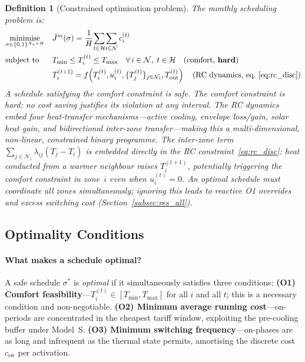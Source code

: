 \documentclass[3p,number]{elsarticle}
\let\oldsubsection\subsection
\renewcommand{\subsection}{\FloatBarrier\oldsubsection}
\newtheorem{definition}{Definition} \newtheorem{proposition}{Proposition} \newtheorem{remark}{Remark} \newtheorem{observation}{Observation}
\newcommand{\sched}{\sigma}
\newcommand{\Tmin}{T_{\min}}
\newcommand{\Tmax}{T_{\max}}
\newcommand{\Tout}{T_{\mathrm{out}}}
\newcommand{\lij}{\lambda_{ij}}
\newcommand{\csw}{c_{\mathrm{sw}}}
\newcommand{\Jbar}{\bar{J}}
\begin{document}
\begin{definition}[Constrained optimisation problem]
\label{def:cop}
The monthly scheduling problem is:
\begin{equation}
\begin{aligned}
  &\underset{\sched\in\{0,1\}^{N_z\times H}}{\text{minimise}}&&
  \Jbar^m(\sched)=\frac{1}{H}
  \!\sum_{t\in\mathcal{H}}\!\sum_{i\in\mathcal{N}} c_i^{(t)}\\
  &\text{subject to}&&
  \Tmin \le T_i^{(t)} \le \Tmax \quad\forall\,i\in\mathcal{N},\;
    t\in\mathcal{H} \quad\text{(comfort, \textbf{hard})}\\
  &&&T_i^{(t+1)}=f\!\left(T_i^{(t)},u_i^{(t)},
    \{T_j^{(t)}\}_{j\in\mathcal{N}_i},\Tout^{(t)}\right)
    \quad\text{(RC dynamics, eq.~\eqref{eq:rc_disc})}
\end{aligned}
\label{eq:cop}
\end{equation}
A schedule satisfying the comfort constraint is \emph{safe}.
The comfort constraint is \emph{hard}: no cost saving justifies its
violation at any interval.
The RC dynamics embed four heat-transfer mechanisms---active cooling,
envelope loss/gain, solar heat gain, and bidirectional inter-zone transfer---making this a
multi-dimensional, non-linear, constrained binary programme.
The inter-zone term $\sum_{j\in\mathcal{N}_i}\lij(T_j-T_i)$ is embedded directly
in the RC constraint~\eqref{eq:rc_disc}: heat conducted from a warmer neighbour raises
$T_i^{(t+1)}$, potentially triggering the comfort constraint in zone~$i$ even when
$u_i^{(t)}=0$.
An optimal schedule must coordinate all zones simultaneously; ignoring this
leads to reactive O1 overrides and excess switching cost
(Section~\ref{subsec:res_all}).
\end{definition}
 
\subsection{Optimality Conditions}
\label{subsec:optcond}
 
\paragraph{What makes a schedule optimal?}
A safe schedule $\sched^*$ is \emph{optimal} if it simultaneously satisfies three conditions: \textbf{(O1) Comfort feasibility}---$T_i^{(t)}\in[\Tmin,\Tmax]$ for all $i$ and all $t$; this is a necessary condition and non-negotiable.
\textbf{(O2) Minimum average running cost}---on-periods are concentrated in the cheapest tariff window, exploiting the pre-cooling buffer under Model~S.
\textbf{(O3) Minimum switching frequency}---on-phases are as long and infrequent as the thermal state permits, amortising the discrete cost $\csw$ per activation.
 
\end{document}
